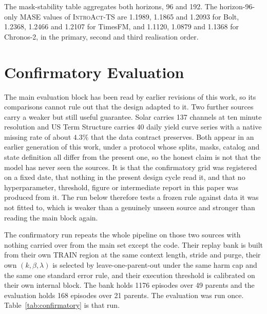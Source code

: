 \documentclass{article}
\newcommand{\introact}{\textsc{IntroAct-TS}}
\begin{document}
The mask-stability table aggregates both horizons, 96 and 192.
The horizon-96-only MASE values of \introact{} are 1.1989, 1.1865 and 1.2093 for Bolt,
1.2368, 1.2466 and 1.2107 for TimesFM, and 1.1120, 1.0879 and 1.1368 for Chronos-2, in the
primary, second and third realisation order.

\section{Confirmatory Evaluation}
\label{app:confirmatory}

The main evaluation block has been read by earlier revisions of this work, so its comparisons
cannot rule out that the design adapted to it. Two further sources carry a weaker but still
useful guarantee. Solar carries 137 channels at ten minute resolution and US Term Structure
carries 40 daily yield curve series with a native missing rate of about $4.3\%$ that the data
contract preserves. Both appear in an earlier generation of this work, under a protocol whose
splits, masks, catalog and state definition all differ from the present one, so the honest
claim is not that the model has never seen the sources. It is that the confirmatory grid was
registered on a fixed date, that nothing in the present design cycle read it, and that no
hyperparameter, threshold, figure or intermediate report in this paper was produced from it.
The run below therefore tests a frozen rule against data it was not fitted to, which is weaker
than a genuinely unseen source and stronger than reading the main block again.

The confirmatory run repeats the whole pipeline on those two sources with nothing carried over
from the main set except the code. Their replay bank is built from their own TRAIN region at
the same context length, stride and purge, their own $(k,\beta,\lambda)$ is selected by
leave-one-parent-out under the same harm cap and the same one standard error rule, and their
execution threshold is calibrated on their own internal block. The bank holds 1176 episodes
over 49 parents and the evaluation holds 168 episodes over 21 parents. The evaluation was run
once. Table~\ref{tab:confirmatory} is that run.
\end{document}
